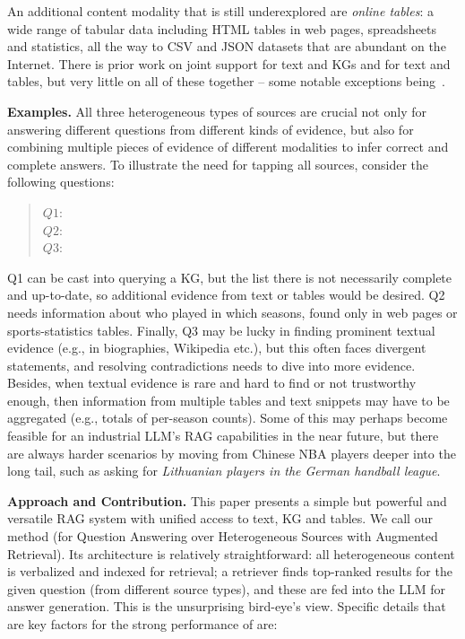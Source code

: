 An additional content modality that is still underexplored are {\em online tables}: a wide range of tabular data including HTML tables in web pages, spreadsheets and statistics, all the way to CSV and JSON datasets that are abundant on the Internet. There is prior work on joint support for text and KGs and for text and tables, but very little on all of these together -- some notable exceptions being~\cite{Christmann-CONVINSE:SIGIR2022,Christmann-Explaignn:SIGIR2023,Oguz-UniK-QA:NAACL2022,Zhang-Spaghetti:ACL2024}.


\noindent\textbf{Examples.} All three heterogeneous types of sources are crucial not only for answering different questions from different kinds of evidence, but also for combining multiple pieces of evidence of different modalities to infer correct and complete answers.
To 
illustrate
the need for tapping all sources, consider the following questions:

\begin{quote}
$Q1$: \\
 \indent $Q2$: \\
  \indent $Q3$: 
\end{quote}

Q1 can be cast into querying a KG, but the list there is not necessarily complete and up-to-date, so additional evidence from text or tables would be desired. 
Q2 needs information about who played in which seasons, found only in web pages or sports-statistics tables. 
Finally, Q3 may be lucky in finding prominent textual evidence (e.g., in biographies, Wikipedia etc.), but this often faces divergent statements, and resolving contradictions needs to dive into more evidence. Besides, when textual evidence is rare and hard to find or not trustworthy enough, then information from multiple tables and text snippets may have to be aggregated (e.g., totals of per-season counts).
Some of this may perhaps become feasible for an industrial LLM’s RAG capabilities in the near future, but there are always harder scenarios by moving from Chinese NBA players deeper into the long tail, such as asking for {\em Lithuanian players in the German handball league}.

\vspace*{0.2cm}
\noindent\textbf{Approach and Contribution.} This paper presents a simple but powerful and versatile RAG system with unified access to text, KG and tables. We call our method {\em \method} 
(for Question Answering over Heterogeneous Sources with Augmented Retrieval).
Its architecture is relatively straightforward: all heterogeneous content is verbalized and indexed for retrieval; a retriever finds top-ranked results for the given question (from different source types), and these are fed into the LLM for answer generation. This is the unsurprising bird-eye’s view. Specific details that are key factors for the strong performance of \method are: 

